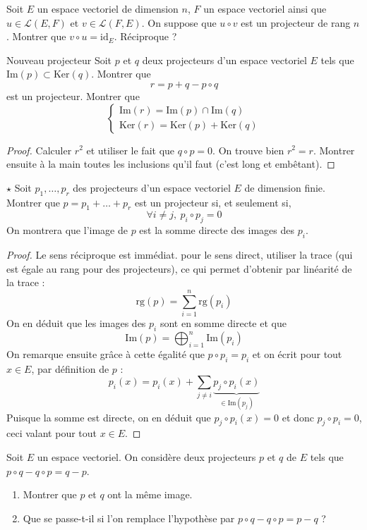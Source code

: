 \documentclass[french,a4paper]{article}
\renewcommand{\ker}{\text{Ker}}
\newcommand{\im}{\text{Im}}
\theoremstyle{plain}
\theoremstyle{definition}
\theoremstyle{remark}
\begin{document}
\begin{ex}[Moulin.54]
	Soit $E$ un espace vectoriel de dimension $n$, $F$ un espace vectoriel ainsi que $u\in\mathcal{L}(E,F)$ et $v\in\mathcal{L}(F,E)$. On suppose que $u\circ v$ est un projecteur de rang $n$. Montrer que $v\circ u=\text{id}_E$. Réciproque ?
\end{ex}

\begin{ex}[Moulin.55]{Nouveau projecteur}
	Soit $p$ et $q$ deux projecteurs d'un espace vectoriel $E$ tels que $\im(p)\subset \ker(q)$. Montrer que $$r=p+q-p\circ q$$ est un projecteur. Montrer que $$\begin{cases}
		\im(r)=\im(p)\cap\im(q) \\
		\ker(r)=\ker(p)+\ker(q)
	\end{cases}$$
\end{ex}
\begin{proof}
	Calculer $r^2$ et utiliser le fait que $q\circ p=0$. On trouve bien $r^2=r$. Montrer ensuite à la main toutes les inclusions qu'il faut (c'est long et embêtant).
\end{proof}

\begin{ex}[Moulin.56]{$\star$}
	Soit $p_1,\ldots,p_r$ des projecteurs d'un espace vectoriel $E$ de dimension finie. Montrer que $p=p_1+\ldots+p_r$ est un projecteur si, et seulement si, $$\forall i\ne j,\ p_i\circ p_j=0$$ On montrera que l'image de $p$ est la somme directe des images des $p_i$.
\end{ex}
\begin{proof}
	Le sens réciproque est immédiat. pour le sens direct, utiliser la trace (qui est égale au rang pour des projecteurs), ce qui permet d'obtenir par linéarité de la trace : $$\text{rg}(p)=\sum_{i=1}^{n}\text{rg}(p_i)$$ On en déduit que les images des $p_i$ sont en somme directe et que $$\im(p)=\bigoplus_{i=1}^n\im(p_i)$$ On remarque ensuite grâce à cette égalité que $p\circ p_i=p_i$ et on écrit pour tout $x\in E$, par définition de $p$ : $$p_i(x)=p_i(x)+\sum_{j\ne i}\underbrace{p_j\circ p_i(x)}_{\in\im(p_j)}$$ Puisque la somme est directe, on en déduit que $p_j\circ p_i(x)=0$ et donc $p_j\circ p_i=0$, ceci valant pour tout $x\in E$.
\end{proof}

\begin{ex}[Moulin.57]{}
	Soit $E$ un espace vectoriel. On considère deux projecteurs $p$ et $q$ de $E$ tels que $p\circ q-q\circ p=q-p$.
	\begin{enumerate}
		\item Montrer que $p$ et $q$ ont la même image.
		\item Que se passe-t-il si l'on remplace l'hypothèse par $p\circ q-q\circ p=p-q$ ?
	\end{enumerate}
\end{ex}
\end{document}
